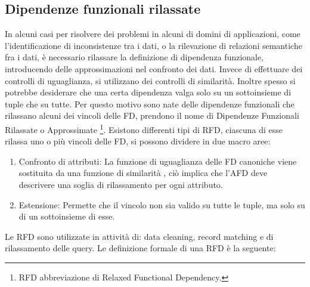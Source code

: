 \subsection{Dipendenze funzionali rilassate}
In alcuni casi per risolvere dei problemi in alcuni di domini di applicazioni, come l’identificazione di inconsistenze tra i dati, o la rilevazione di relazioni semantiche fra i dati,  è necessario rilassare la definizione di dipendenza funzionale, introducendo delle approssimazioni nel confronto dei dati. Invece di effettuare dei controlli di uguaglianza, si utilizzano dei controlli di similarità.
Inoltre spesso si potrebbe desiderare che una certa dipendenza valga solo su un sottoinsieme di tuple che su tutte.
Per questo motivo sono nate delle dipendenze funzionali che rilassano alcuni dei vincoli delle FD, prendono il nome di Dipendenze Funzionali Rilassate o Approssimate \footnote{RFD abbreviazione di Relaxed Functional Dependency.}.
Esistono differenti tipi di RFD, ciascuna di esse rilassa uno o più vincoli delle FD, si possono dividere in due macro aree:
\begin{enumerate}
	\item Confronto di attributi: La funzione di uguaglianza delle FD canoniche viene sostituita da una funzione di similarità , ciò implica che l'AFD deve descrivere una soglia di rilassamento per ogni attributo.
	\item Estensione: Permette che il vincolo non sia valido su tutte le tuple, ma solo su di un sottoinsieme di esse.
\end{enumerate}
Le RFD sono utilizzate in attività di:
data cleaning, record matching e di rilassamento delle query.
Le definizione formale di una RFD è la seguente:
